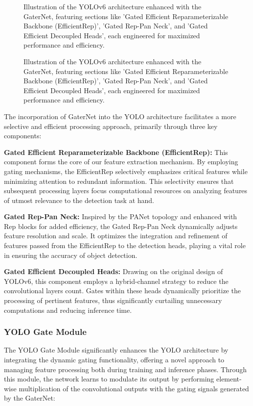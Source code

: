 \begin{figure}[ht]
\centering

\caption{Illustration of the YOLOv6 architecture enhanced with the GaterNet, featuring sections like 'Gated Efficient Reparameterizable Backbone (EfficientRep)', 'Gated Rep-Pan Neck', and 'Gated Efficient Decoupled Heads', each engineered for maximized performance and efficiency.}
\label{fig:yolo_architecture}
\end{figure}

\begin{figure}[ht]
    \centering
    
    \caption{Illustration of the YOLOv6 architecture enhanced with the GaterNet, featuring sections like 'Gated Efficient Reparameterizable Backbone (EfficientRep)', 'Gated Rep-Pan Neck', and 'Gated Efficient Decoupled Heads', each engineered for maximized performance and efficiency.}
    \label{fig:gating_mechanism}
    \end{figure}

The incorporation of GaterNet into the YOLO architecture facilitates a more selective and efficient processing approach, primarily through three key components:

\textbf{Gated Efficient Reparameterizable Backbone (EfficientRep):} This component forms the core of our feature extraction mechanism. By employing gating mechanisms, the EfficientRep selectively emphasizes critical features while minimizing attention to redundant information. This selectivity ensures that subsequent processing layers focus computational resources on analyzing features of utmost relevance to the detection task at hand.

\textbf{Gated Rep-Pan Neck:} Inspired by the PANet topology and enhanced with Rep blocks for added efficiency, the Gated Rep-Pan Neck dynamically adjusts feature resolution and scale. It optimizes the integration and refinement of features passed from the EfficientRep to the detection heads, playing a vital role in ensuring the accuracy of object detection.

\textbf{Gated Efficient Decoupled Heads:} Drawing on the original design of YOLOv6, this component employs a hybrid-channel strategy to reduce the convolutional layers count. Gates within these heads dynamically prioritize the processing of pertinent features, thus significantly curtailing unnecessary computations and reducing inference time.

\subsubsection{YOLO Gate Module}
The YOLO Gate Module significantly enhances the YOLO architecture by integrating the dynamic gating functionality, offering a novel approach to managing feature processing both during training and inference phases. Through this module, the network learns to modulate its output by performing element-wise multiplication of the convolutional outputs with the gating signals generated by the GaterNet:

